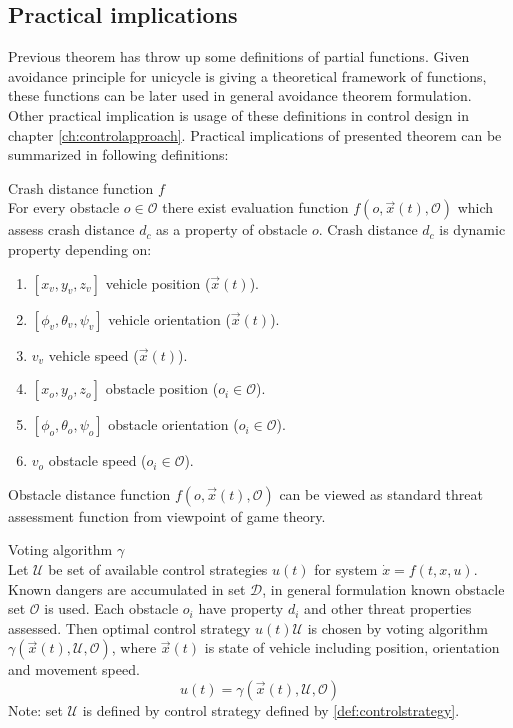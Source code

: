 \subsection{Practical implications}
Previous theorem has throw up some definitions of partial functions. Given avoidance principle for unicycle is giving a theoretical framework of functions, these functions can be later used in general avoidance theorem formulation. Other practical implication is usage of these definitions in control design in chapter \ref{ch:controlapproach}. Practical implications of presented theorem can be summarized in following definitions:

\begin{definition}{Crash distance function $f$}\label{def:crashdistance}
\\For every obstacle $o \in \mathscr{O}$ there exist evaluation function $f(o,\vec{x}(t),\mathscr{O})$ which assess crash distance $d_c$ as a property of obstacle $o$. Crash distance $d_c$ is dynamic property depending on:
\begin{enumerate}
    \item $[x_v,y_v,z_v]$ vehicle position ($\vec{x}(t)$).
    \item $[\phi_v,\theta_v,\psi_v]$ vehicle orientation ($\vec{x}(t)$).
    \item $v_v$ vehicle speed ($\vec{x}(t)$).
    \item $[x_o,y_o,z_o]$ obstacle position ($o_i \in \mathscr{O}$).
    \item $[\phi_o,\theta_o,\psi_o]$ obstacle orientation ($o_i \in \mathscr{O}$).
    \item $v_o$ obstacle speed ($o_i \in \mathscr{O}$).
\end{enumerate}
Obstacle distance function $f(o,\vec{x}(t),\mathscr{O})$ can be viewed as standard threat assessment function from viewpoint of game theory.
\end{definition}

\begin{definition}{Voting algorithm $\gamma$}\label{ref:voting}
\\Let $\mathscr{U}$ be set of available control strategies $u(t)$ for system $\dot{x}=f(t,x,u)$. Known dangers are accumulated in set $\mathscr{D}$, in general formulation known obstacle set $\mathscr{O}$ is used. Each obstacle $o_i$ have property $d_i$ and other threat properties assessed. Then optimal control strategy $u(t) \mathscr{U}$ is chosen by voting algorithm $\gamma(\vec{x}(t),\mathscr{U},\mathscr{O})$, where $\vec{x}(t)$ is state of vehicle including position, orientation and movement speed. 
\begin{equation}
   u(t)= \gamma(\vec{x}(t),\mathscr{U},\mathscr{O})
\end{equation}
Note: set $\mathscr{U}$  is defined by control strategy defined by \ref{def:controlstrategy}.
\end{definition}

